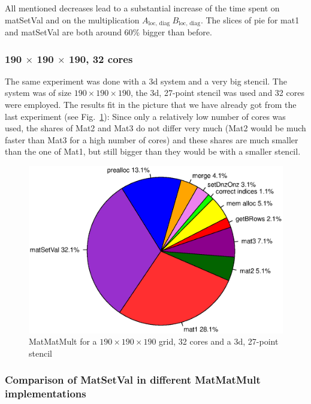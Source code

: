 All mentioned decreases lead to a substantial increase of the time spent on matSetVal and on the multiplication $A_{\textrm{loc, diag~}} B_{\textrm{loc, diag}}$. The slices of pie for mat1 and matSetVal are both around 60\% bigger than before.

\subsubsection*{190 $\times$ 190 $\times$ 190, 32 cores}
The same experiment was done with a 3d system and a very big stencil. The system was of size $190 \times 190 \times 190$, the 3d, 27-point stencil was used and 32 cores were employed. The results fit in the picture that we have already got from the last experiment (see Fig.~\ref{fig:pie_32_190}): Since only a relatively low number of cores was used, the shares of Mat2 and Mat3 do not differ very much (Mat2 would be much faster than Mat3 for a high number of cores) and these shares are much smaller than the one of Mat1, but still bigger than they would be with a smaller stencil. 

\begin{figure}[tbp]
	\centering
	\includegraphics[width=1\textwidth, trim={0 3.5cm 0 3cm},clip]{32cores_190}
	\caption{MatMatMult for a $190 \times 190 \times 190$ grid, 32 cores and a 3d, 27-point stencil} 
	\label{fig:pie_32_190}
\end{figure}

\subsubsection*{Comparison of MatSetVal in different MatMatMult implementations}

